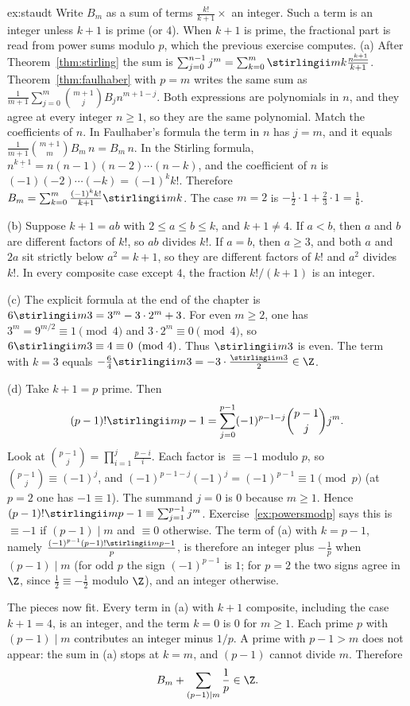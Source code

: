 \begin{solution}{ex:staudt}
\idea Write $B_m$ as a sum of terms $\frac{k!}{k+1}\times$ an integer. Such a term is an integer unless $k+1$ is prime (or $4$). When $k+1$ is prime, the fractional part is read from power sums modulo $p$, which the previous exercise computes.
\writeup (a) After Theorem~\ref{thm:stirling} the sum is $\sum_{j=0}^{n-1}j^m=\sum_{k=0}^m\stirlingii mk\frac{n^{\underline{k+1}}}{k+1}$. Theorem~\ref{thm:faulhaber} with $p=m$ writes the same sum as $\frac1{m+1}\sum_{j=0}^m\binom{m+1}jB_jn^{m+1-j}$. Both expressions are polynomials in $n$, and they agree at every integer $n\ge1$, so they are the same polynomial. Match the coefficients of $n$. In Faulhaber's formula the term in $n$ has $j=m$, and it equals $\frac1{m+1}\binom{m+1}mB_m\,n=B_m\,n$. In the Stirling formula, $n^{\underline{k+1}}=n(n-1)(n-2)\cdots(n-k)$, and the coefficient of $n$ is $(-1)(-2)\cdots(-k)=(-1)^kk!$. Therefore $B_m=\sum_{k=0}^m\frac{(-1)^kk!}{k+1}\stirlingii mk$. The case $m=2$ is $-\frac12\cdot1+\frac23\cdot1=\frac16$.

(b) Suppose $k+1=ab$ with $2\le a\le b\le k$, and $k+1\ne4$. If $a<b$, then $a$ and $b$ are different factors of $k!$, so $ab$ divides $k!$. If $a=b$, then $a\ge3$, and both $a$ and $2a$ sit strictly below $a^2=k+1$, so they are different factors of $k!$ and $a^2$ divides $k!$. In every composite case except $4$, the fraction $k!/(k+1)$ is an integer.

(c) The explicit formula at the end of the chapter is $6\stirlingii m3=3^m-3\cdot2^m+3$. For even $m\ge2$, one has $3^m=9^{m/2}\equiv1\pmod 4$ and $3\cdot2^m\equiv0\pmod 4$, so $6\stirlingii m3\equiv4\equiv0\pmod 4$. Thus $\stirlingii m3$ is even. The term with $k=3$ equals $-\frac64\stirlingii m3=-3\cdot\frac{\stirlingii m3}2\in\Z$.

(d) Take $k+1=p$ prime. Then
\[
(p-1)!\stirlingii m{p-1}=\sum_{j=0}^{p-1}(-1)^{p-1-j}\binom{p-1}jj^m.
\]
Look at $\binom{p-1}j=\prod_{i=1}^j\frac{p-i}i$. Each factor is $\equiv-1$ modulo $p$, so $\binom{p-1}j\equiv(-1)^j$, and $(-1)^{p-1-j}(-1)^j=(-1)^{p-1}\equiv1\pmod p$ (at $p=2$ one has $-1\equiv1$). The summand $j=0$ is $0$ because $m\ge1$. Hence $(p-1)!\stirlingii m{p-1}\equiv\sum_{j=1}^{p-1}j^m$. Exercise~\ref{ex:powersmodp} says this is $\equiv-1$ if $(p-1)\mid m$ and $\equiv0$ otherwise. The term of (a) with $k=p-1$, namely $\frac{(-1)^{p-1}(p-1)!\stirlingii m{p-1}}p$, is therefore an integer plus $-\frac1p$ when $(p-1)\mid m$ (for odd $p$ the sign $(-1)^{p-1}$ is $1$; for $p=2$ the two signs agree in $\Z$, since $\frac12\equiv-\frac12$ modulo $\Z$), and an integer otherwise.

The pieces now fit. Every term in (a) with $k+1$ composite, including the case $k+1=4$, is an integer, and the term $k=0$ is $0$ for $m\ge1$. Each prime $p$ with $(p-1)\mid m$ contributes an integer minus $1/p$. A prime with $p-1>m$ does not appear: the sum in (a) stops at $k=m$, and $(p-1)$ cannot divide $m$. Therefore
\[
B_m+\sum_{(p-1)\mid m}\frac1p\in\Z.
\]
\end{solution}

